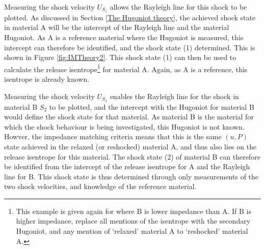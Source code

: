 Measuring the shock velocity $U_{S_1}$ allows the Rayleigh line for this shock to be plotted. As discussed in Section \ref{The Hugoniot theory}, the achieved shock state in material A will be the intercept of the Rayleigh line and the material Hugoniot. As A is a reference material where the Hugoniot is measured, this intercept can therefore be identified, and the shock state (1) determined. This is shown in Figure \ref{fig:IMTheory2}. This shock state (1) can then be used to calculate the release isentrope\footnote{This example is given again for where B is lower impedance than A. If B is higher impedance, replace all mentions of the isentrope with the secondary Hugoniot, and any mention of `relaxed' material A to `reshocked' material A.} for material A. Again, as A is a reference, this isentrope is already known.

Measuring the shock velocity $U_{S_2}$ enables the Rayleigh line for the shock in material B $S_2$ to be plotted, and the intercept with the Hugoniot for material B would define the shock state for that material. As material B is the material for which the shock behaviour is being investigated, this Hugoniot is not known. Howver, the impedance matching criteria means that this is the same $(u, P)$ state achieved in the relaxed (or reshocked) material A, and thus also lies on the release isentrope for this material. The shock state (2) of material B can therefore be identified from the intercept of the release isentrope for A and the Rayleigh line for B. This shock state is thus determined through only measurements of the two shock velocities, and knowledge of the reference material.

